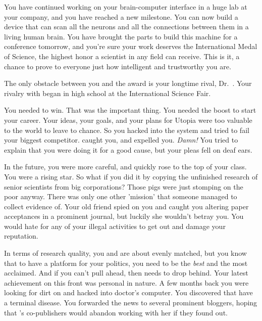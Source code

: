 \documentclass[char]{guildcamp1}
\begin{document}
You have continued working on your brain-computer interface in a huge lab at your company, and you have reached a new milestone.  You can now build a device that can scan all the neurons and all the connections between them in a living human brain.  You have brought the parts to build this machine for a conference tomorrow, and you're sure your work deserves the International Medal of Science, the highest honor a scientist in any field can receive.  This is it, a chance to prove to everyone just how intelligent and trustworthy you are.

The only obstacle between you and the award is your longtime rival, Dr.~\cScientist{\intro}.  Your rivalry with \cScientist{} began in high school at the International Science Fair.  %

You needed to win. That was the important thing. You needed the boost to start your career. Your ideas, your goals, and your plans for Utopia were too valuable to the world to leave to chance. So you hacked into the system and tried to fail your biggest competitor. \cScientist{} caught you, and expelled you. \emph{Damn!} You tried to explain that you were doing it for a good cause, but your pleas fell on deaf ears.

In the future, you were more careful, and quickly rose to the top of your class. You were a rising star. So what if you did it by copying the unfinished research of senior scientists from big corporations? Those pigs were just stomping on the poor anyway. There was only one other 'mission' that someone managed to collect evidence of.  Your old friend \cBride{} spied on you and caught you altering paper acceptances in a prominent journal, but luckily she wouldn't betray you.  You would hate for any of your illegal activities to get out and damage your reputation.

In terms of research quality, you and \cScientist{} are about evenly matched, but you know that to have a platform for your politics, you need to be the \emph{best} and the most acclaimed. And if you can't pull ahead, then \cScientist{} needs to drop behind. Your latest achievement on this front was personal in nature. A few months back you were looking for dirt on \cScientist{} and hacked into \cScientist{\Their} doctor's computer. You discovered that \cScientist{\They{}} have a terminal disease. You forwarded the news to several prominent bloggers, hoping that \cScientist{}'s co-publishers would abandon working with her if they found out.
\end{document}

